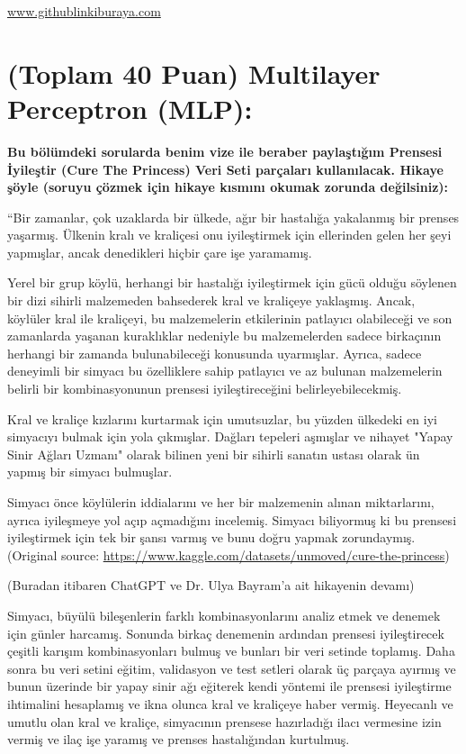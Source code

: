 \documentclass[11pt]{article}
\begin{document}
\url{www.githublinkiburaya.com}

\section{(Toplam 40 Puan) Multilayer Perceptron (MLP):} 
\textbf{Bu bölümdeki sorularda benim vize ile beraber paylaştığım Prensesi İyileştir (Cure The Princess) Veri Seti parçaları kullanılacak. Hikaye şöyle (soruyu çözmek için hikaye kısmını okumak zorunda değilsiniz):} 

``Bir zamanlar, çok uzaklarda bir ülkede, ağır bir hastalığa yakalanmış bir prenses yaşarmış. Ülkenin kralı ve kraliçesi onu iyileştirmek için ellerinden gelen her şeyi yapmışlar, ancak denedikleri hiçbir çare işe yaramamış.

Yerel bir grup köylü, herhangi bir hastalığı iyileştirmek için gücü olduğu söylenen bir dizi sihirli malzemeden bahsederek kral ve kraliçeye yaklaşmış. Ancak, köylüler kral ile kraliçeyi, bu malzemelerin etkilerinin patlayıcı olabileceği ve son zamanlarda yaşanan kuraklıklar nedeniyle bu malzemelerden sadece birkaçının herhangi bir zamanda bulunabileceği konusunda uyarmışlar. Ayrıca, sadece deneyimli bir simyacı bu özelliklere sahip patlayıcı ve az bulunan malzemelerin belirli bir kombinasyonunun prensesi iyileştireceğini belirleyebilecekmiş.

Kral ve kraliçe kızlarını kurtarmak için umutsuzlar, bu yüzden ülkedeki en iyi simyacıyı bulmak için yola çıkmışlar. Dağları tepeleri aşmışlar ve nihayet "Yapay Sinir Ağları Uzmanı" olarak bilinen yeni bir sihirli sanatın ustası olarak ün yapmış bir simyacı bulmuşlar.

Simyacı önce köylülerin iddialarını ve her bir malzemenin alınan miktarlarını, ayrıca iyileşmeye yol açıp açmadığını incelemiş. Simyacı biliyormuş ki bu prensesi iyileştirmek için tek bir şansı varmış ve bunu doğru yapmak zorundaymış. (Original source: \url{https://www.kaggle.com/datasets/unmoved/cure-the-princess})

(Buradan itibaren ChatGPT ve Dr. Ulya Bayram'a ait hikayenin devamı)

Simyacı, büyülü bileşenlerin farklı kombinasyonlarını analiz etmek ve denemek için günler harcamış. Sonunda birkaç denemenin ardından prensesi iyileştirecek çeşitli karışım kombinasyonları bulmuş ve bunları bir veri setinde toplamış. Daha sonra bu veri setini eğitim, validasyon ve test setleri olarak üç parçaya ayırmış ve bunun üzerinde bir yapay sinir ağı eğiterek kendi yöntemi ile prensesi iyileştirme ihtimalini hesaplamış ve ikna olunca kral ve kraliçeye haber vermiş. Heyecanlı ve umutlu olan kral ve kraliçe, simyacının prensese hazırladığı ilacı vermesine izin vermiş ve ilaç işe yaramış ve prenses hastalığından kurtulmuş.
\end{document}
